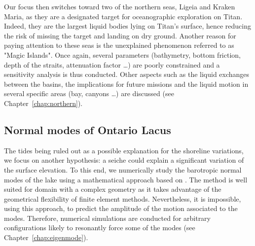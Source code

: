 Our focus then switches toward two of the northern seas, Ligeia and Kraken Maria, as they are a designated target for oceanographic exploration on Titan. Indeed, they are the largest liquid bodies lying on Titan's surface, hence reducing the risk of missing the target and landing on dry ground. Another reason for paying attention to these seas is the unexplained phenomenon referred to as "Magic Islands". Once again, several parameters (bathymetry, bottom friction, depth of the straits, attenuation factor \dots) are poorly constrained and a sensitivity analysis is thus conducted. Other aspects such as the liquid exchanges between the basins, the implications for future missions and the liquid motion in several specific areas (bay, canyons \dots) are discussed (see Chapter~\ref{chap:northern}).

\subsection{Normal modes of Ontario Lacus}
The tides being ruled out as a possible explanation for the shoreline variations, we focus on another hypothesis: a seiche could explain a significant variation of the surface elevation. To this end, we numerically study the barotropic normal modes of the lake using a mathematical approach based on \cite{bernard2008dispersion}. The method is well suited for domain with a complex geometry as it takes advantage of the geometrical flexibility of finite element methods. Nevertheless, it is impossible, using this approach, to predict the amplitude of the motion associated to the modes. Therefore, numerical simulations are conducted for arbitrary configurations likely to resonantly force some of the modes (see Chapter~\ref{chap:eigenmode}). 

